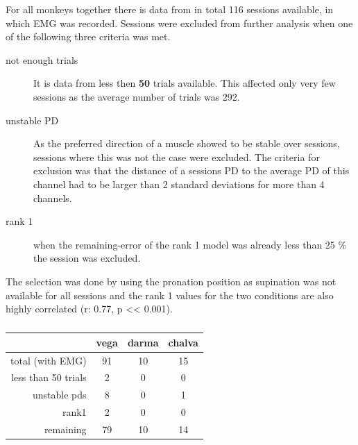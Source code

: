 For all monkeys together there is data from in total 116 sessions available, in which EMG was recorded. Sessions were excluded from further analysis when one of the following three criteria was met. 
\begin{description}
    \item[not enough trials] It is data from less then \textbf{50} trials available. This affected only very few sessions as the average number of trials was 292.
    \item[unstable PD] As the preferred direction of a muscle showed to be stable over sessions, sessions where this was not the case were excluded. The criteria for exclusion was that the distance of a sessions PD to the average PD of this channel had to be larger than 2 standard deviations for more than 4 channels.
    \item[rank 1] when the remaining-error of the rank 1 model was already less than 25 \% the session was excluded.
\end{description}
The selection was done by using the pronation position as supination was not available for all sessions and the rank 1 values for the two conditions are also highly correlated (r: 0.77, p << 0.001).


\begin{table}[ht]
	\centering
	\begin{tabular}{r|c|c|c}
		\toprule
		                    & vega  & darma & chalva \\
		\toprule
		total (with EMG)    & 91    & 10    & 15\\
		less than 50 trials & 2     & 0     & 0\\
		unstable pds        & 8     & 0     & 1\\
		rank1               & 2     & 0     & 0\\
		\bottomrule
		remaining           & 79    & 10    & 14\\		
		\bottomrule
	\end{tabular}
	\caption{}
	\label{sg:tab:sorting_table_nat}	
\end{table}


